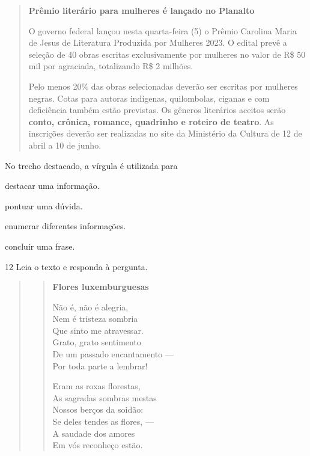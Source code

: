 \begin{quote}
\textbf{Prêmio literário para mulheres é lançado no Planalto}

O governo federal lançou nesta quarta-feira (5) o Prêmio Carolina Maria
de Jesus de Literatura Produzida por Mulheres 2023. O edital prevê a
seleção de 40 obras escritas exclusivamente por mulheres no valor de R\$
50 mil por agraciada, totalizando R\$ 2 milhões.

Pelo menos 20\% das obras selecionadas deverão ser escritas por mulheres
negras. Cotas para autoras indígenas, quilombolas, ciganas e com
deficiência também estão previstas. Os gêneros literários aceitos serão
\textbf{conto, crônica, romance, quadrinho e roteiro de teatro}. As
inscrições deverão ser realizadas no site da Ministério da Cultura de 12
de abril a 10 de junho.

\end{quote}

No trecho destacado, a vírgula é utilizada para

\begin{escolha}
  \item destacar uma informação.

  \item pontuar uma dúvida.

  \item enumerar diferentes informações.

  \item concluir uma frase.
\end{escolha}

\num{12} Leia o texto e responda à pergunta.

\begin{quote}
\begin{verse}
\textbf{Flores luxemburguesas}

Não é, não é alegria,\\
Nem é tristeza sombria\\
Que sinto me atravessar.\\
Grato, grato sentimento\\
De um passado encantamento ---\\
Por toda parte a lembrar!

Eram as roxas florestas,\\
As sagradas sombras mestas\\
Nossos berços da soidão:\\
Se deles tendes as flores, ---\\
A saudade dos amores\\
Em vós reconheço estão.
\end{verse}

\end{quote}

